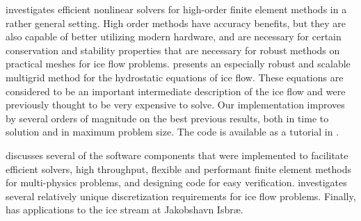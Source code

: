  investigates efficient nonlinear solvers for high-order finite element methods in a rather general setting.
High order methods have accuracy benefits, but they are also capable of better utilizing modern hardware, and are necessary for certain conservation and stability properties that are necessary for robust methods on practical meshes for ice flow problems.
 presents an especially robust and scalable multigrid method for the hydrostatic equations of ice flow.
These equations are considered to be an important intermediate description of the ice flow and were previously thought to be very expensive to solve.
Our implementation improves by several orders of magnitude on the best previous results, both in time to solution and in maximum problem size.
The code is available as a tutorial in {\PETSc}.

 discusses several of the software components that were implemented to facilitate efficient solvers, high throughput, flexible and performant finite element methods for multi-physics problems, and designing code for easy verification.
 investigates several relatively unique discretization requirements for ice flow problems.
Finally,  has applications to the ice stream at Jakobshavn Isbr{\ae}.
